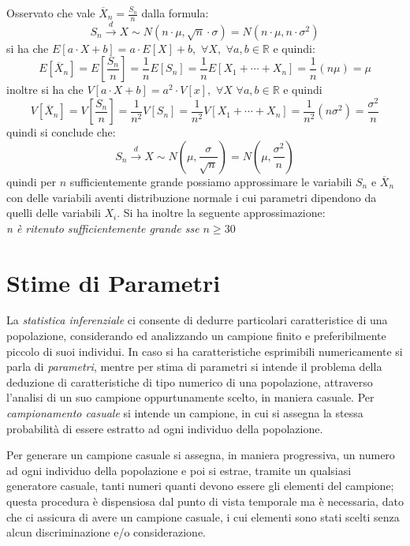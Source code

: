 \documentclass[a4paper,12pt, oneside]{book}
\newcommand{\numberset}{\mathbb}
\newcommand{\R}{\numberset{R}}
\begin{document}
Osservato che vale $\overline{X}_n = \frac{S_n}{n}$ dalla formula:
\[S_n \stackrel{d}{\longrightarrow} X \sim N(n \cdot \mu, \sqrt{n} \cdot \sigma) = N(n \cdot \mu, n \cdot \sigma^2)\]
si ha che $E[a \cdot X + b] = a \cdot E[X] + b,\,\, \forall X,\,\, \forall a,b \in \R$ e quindi:
\[E[\overline{X}_n] = E\left[\frac{S_n}{n}\right] = \frac{1}{n}E[S_n] = \frac{1}{n} E[X_1+\cdots +X_n] = \frac{1}{n}(n\mu) = \mu\]
inoltre si ha che $V[a \cdot X + b] = a^2 \cdot V[x],\,\, \forall X \,\, \forall a,b \in \R$ e quindi
\[V[\overline{X}_n]=V\left[\frac{S_n}{n}\right]=\frac{1}{n^2}V[S_n]=\frac{1}{n^2}V[X_1+\cdots+X_n]=\frac{1}{n^2}(n\sigma^2)=\frac{\sigma^2}{n}\]
quindi si conclude che:
\[S_n\stackrel{d}{\longrightarrow}X\sim N(\mu, \frac{\sigma}{\sqrt{n}})=N(\mu, \frac{\sigma^2}{n})\]
quindi per $n$ sufficientemente grande possiamo approssimare le variabili $S_n$ e $\overline{X}_n$ con 
delle variabili aventi distribuzione normale i cui parametri dipendono da quelli delle variabili $X_i$.\newline
Si ha inoltre la seguente approssimazione:\\
\textit{n è ritenuto sufficientemente grande sse $n\geq 30$}

\chapter{Stime di Parametri}
La \emph{statistica inferenziale} ci consente di dedurre particolari caratteristice di una popolazione, considerando
ed analizzando un campione finito e preferibilmente piccolo di suoi individui.\newline
In caso si ha caratteristiche esprimibili numericamente si parla di \emph{parametri}, mentre per stima di parametri
si intende il problema della deduzione di caratteristiche di tipo numerico di una popolazione, attraverso
l'analisi di un suo campione oppurtunamente scelto, in maniera casuale.\newline
Per \emph{campionamento casuale} si intende un campione, in cui si assegna la stessa probabilità di essere estratto
ad ogni individuo della popolazione.

Per generare un campione casuale si assegna, in maniera progressiva, un numero ad ogni individuo della popolazione 
e poi si estrae, tramite un qualsiasi generatore casuale, tanti numeri quanti devono essere gli elementi del campione;
questa procedura è dispensiosa dal punto di vista temporale ma è necessaria, dato che ci assicura di avere un
campione casuale, i cui elementi sono stati scelti senza alcun discriminazione e/o considerazione.\newline
\end{document}
